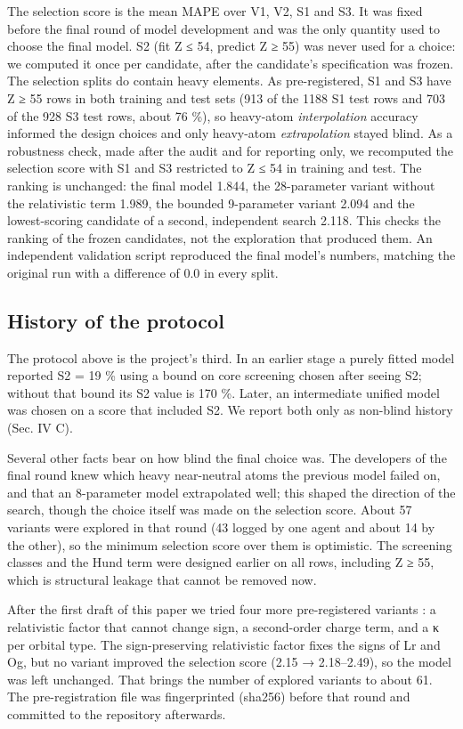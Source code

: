 \documentclass[aps,pra,preprint,notitlepage,superscriptaddress,amsmath,amssymb]{revtex4-2}
\begin{document}
The selection score is the mean MAPE over V1, V2, S1 and S3. It was fixed before the final round of model development and was the only quantity used to choose the final model. S2 (fit Z ≤ 54, predict Z ≥ 55) was never used for a choice: we computed it once per candidate, after the candidate's specification was frozen. The selection splits do contain heavy elements. As pre-registered, S1 and S3 have Z ≥ 55 rows in both training and test sets (913 of the 1188 S1 test rows and 703 of the 928 S3 test rows, about 76 \%), so heavy-atom \emph{interpolation} accuracy informed the design choices and only heavy-atom \emph{extrapolation} stayed blind. As a robustness check, made after the audit and for reporting only, we recomputed the selection score with S1 and S3 restricted to Z ≤ 54 in training and test. The ranking is unchanged: the final model 1.844, the 28-parameter variant without the relativistic term 1.989, the bounded 9-parameter variant 2.094 and the lowest-scoring candidate of a second, independent search 2.118. This checks the ranking of the frozen candidates, not the exploration that produced them. An independent validation script reproduced the final model's numbers, matching the original run with a difference of 0.0 in every split.


\subsection{History of the protocol}

The protocol above is the project's third. In an earlier stage a purely fitted model reported S2 = 19 \% using a bound on core screening chosen after seeing S2; without that bound its S2 value is 170 \%. Later, an intermediate unified model was chosen on a score that included S2. We report both only as non-blind history (Sec. IV C).


Several other facts bear on how blind the final choice was. The developers of the final round knew which heavy near-neutral atoms the previous model failed on, and that an 8-parameter model extrapolated well; this shaped the direction of the search, though the choice itself was made on the selection score. About 57 variants were explored in that round (43 logged by one agent and about 14 by the other), so the minimum selection score over them is optimistic. The screening classes and the Hund term were designed earlier on all rows, including Z ≥ 55, which is structural leakage that cannot be removed now.


After the first draft of this paper we tried four more pre-registered variants : a relativistic factor that cannot change sign, a second-order charge term, and a κ per orbital type. The sign-preserving relativistic factor fixes the signs of Lr and Og, but no variant improved the selection score (2.15 → 2.18–2.49), so the model was left unchanged. That brings the number of explored variants to about 61. The pre-registration file was fingerprinted  (sha256) before that round and committed to the repository afterwards.
\end{document}
